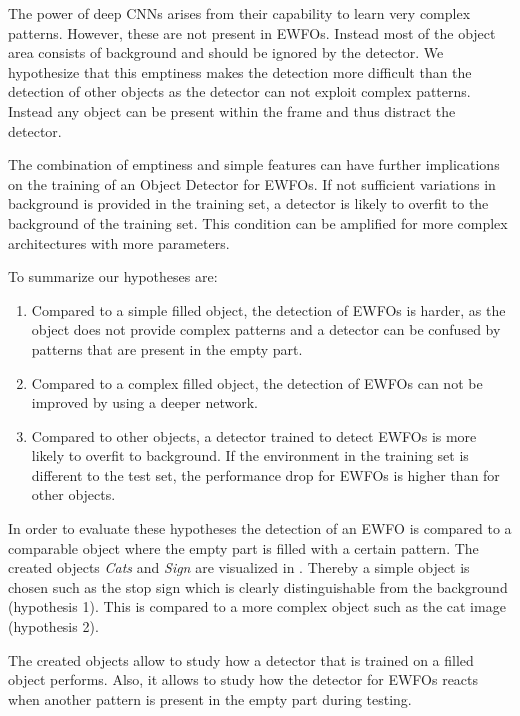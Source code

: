 The power of deep \acp{CNN} arises from their capability to learn very complex patterns. However, these are not present in \acp{EWFO}. Instead most of the object area consists of background and should be ignored by the detector. We hypothesize that this emptiness makes the detection more difficult than the detection of other objects as the detector can not exploit complex patterns. Instead any object can be present within the frame and thus distract the detector.

The combination of emptiness and simple features can have further implications on the training of an Object Detector for \acp{EWFO}. If not sufficient variations in background is provided in the training set, a detector is likely to overfit to the background of the training set. This condition can be amplified for more complex architectures with more parameters.

To summarize our hypotheses are:
\begin{enumerate}
	\item Compared to a simple filled object, the detection of \acp{EWFO} is harder, as the object does not provide complex patterns and a detector can be confused by patterns that are present in the empty part. 
	\item Compared to a complex filled object, the detection of \acp{EWFO} can not be improved by using a deeper network.
	\item Compared to other objects, a detector trained to detect \acp{EWFO} is more likely to overfit to background.  If the environment in the training set is different to the test set, the performance drop for \acp{EWFO} is higher than for other objects. 
\end{enumerate}

In order to evaluate these hypotheses the detection of an \ac{EWFO} is compared to a comparable object where the empty part is filled with a certain pattern. The created objects \textit{Cats} and \textit{Sign} are visualized in . Thereby a simple object is chosen such as the stop sign which is clearly distinguishable from the background (hypothesis 1). This is compared to a more complex object such as the cat image (hypothesis 2).

The created objects allow to study how a detector that is trained on a filled object performs. Also, it allows to study how the detector for \acp{EWFO} reacts when another pattern is present in the empty part during testing.

